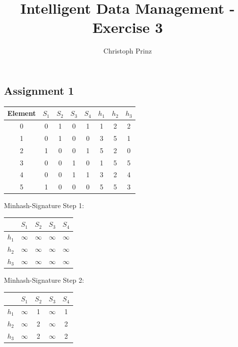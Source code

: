 \documentclass[]{scrartcl}
\title{Intelligent Data Management - Exercise 3}
\author{Christoph Prinz}
\begin{document}
\maketitle

\subsection*{Assignment 1}

\begin{tabular}{c|c|c|c|c||c|c|c}
	Element & $S_1$ & $S_2$ & $S_3$  & $S_4$ & $h_1$ & $h_2$ & $h_3$  \\ 
	\hline\hline
	0 & 0 & 1 & 0 & 1 & 1  & 2 & 2 \\ 
	\hline 
	1 & 0 & 1 & 0 & 0 & 3 & 5  & 1 \\ 
	\hline 
	2 & 1 & 0 & 0 & 1 & 5 & 2 & 0  \\ 
	\hline 
	3 & 0 & 0 & 1 & 0 & 1 & 5 & 5 \\ 
	\hline 
	4 & 0 & 0 & 1 & 1 & 3 & 2 & 4 \\ 
	\hline 
	5 & 1 & 0 & 0 & 0 & 5 & 5 & 3 \\ 
\end{tabular} 

\vspace{1cm}

Minhash-Signature Step 1:\\
\begin{tabular}{c||c|c|c|c}
	& $S_1$ & $S_2$ & $S_3$ &$S_4$  \\ 
	\hline \hline
 $h_1$	& $\infty$ & $\infty$ & $\infty$ & $\infty$ \\ 
	\hline 
$h_2$	& $\infty$ & $\infty$ & $\infty$ & $\infty$ \\ 
	\hline 
$h_3$	& $\infty$ & $\infty$ & $\infty$ & $\infty$ \\ 
\end{tabular}

\vspace{1cm}

Minhash-Signature Step 2:\\
\begin{tabular}{c||c|c|c|c}
			& $S_1$ & $S_2$ & $S_3$ &$S_4$  \\ 
	\hline \hline
	$h_1$	&  $\infty$ & 1 & $\infty$ & 1 \\ 
	\hline 
	$h_2$	&  $\infty$ & 2 & $\infty$ & 2 \\ 
	\hline 
	$h_3$	&  $\infty$ & 2 & $\infty$ & 2 \\ 
\end{tabular} 
\end{document}
